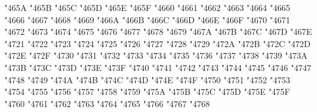 {\Uchar\jis"465A %
\Uchar\jis"465B %
\Uchar\jis"465C %
\Uchar\jis"465D %
\Uchar\jis"465E %
\Uchar\jis"465F %
\Uchar\jis"4660 %
\Uchar\jis"4661 %
\Uchar\jis"4662 %
\Uchar\jis"4663 %
\Uchar\jis"4664 %
\Uchar\jis"4665 %
\Uchar\jis"4666 %
\Uchar\jis"4667 %
\Uchar\jis"4668 %
\Uchar\jis"4669 %
\Uchar\jis"466A %
\Uchar\jis"466B %
\Uchar\jis"466C %
\Uchar\jis"466D %
\Uchar\jis"466E %
\Uchar\jis"466F %
\Uchar\jis"4670 %
\Uchar\jis"4671 %
\Uchar\jis"4672 %
\Uchar\jis"4673 %
\Uchar\jis"4674 %
\Uchar\jis"4675 %
\Uchar\jis"4676 %
\Uchar\jis"4677 %
\Uchar\jis"4678 %
\Uchar\jis"4679 %
\Uchar\jis"467A %
\Uchar\jis"467B %
\Uchar\jis"467C %
\Uchar\jis"467D %
\Uchar\jis"467E %
\Uchar\jis"4721 %
\Uchar\jis"4722 %
\Uchar\jis"4723 %
\Uchar\jis"4724 %
\Uchar\jis"4725 %
\Uchar\jis"4726 %
\Uchar\jis"4727 %
\Uchar\jis"4728 %
\Uchar\jis"4729 %
\Uchar\jis"472A %
\Uchar\jis"472B %
\Uchar\jis"472C %
\Uchar\jis"472D %
\Uchar\jis"472E %
\Uchar\jis"472F %
\Uchar\jis"4730 %
\Uchar\jis"4731 %
\Uchar\jis"4732 %
\Uchar\jis"4733 %
\Uchar\jis"4734 %
\Uchar\jis"4735 %
\Uchar\jis"4736 %
\Uchar\jis"4737 %
\Uchar\jis"4738 %
\Uchar\jis"4739 %
\Uchar\jis"473A %
\Uchar\jis"473B %
\Uchar\jis"473C %
\Uchar\jis"473D %
\Uchar\jis"473E %
\Uchar\jis"473F %
\Uchar\jis"4740 %
\Uchar\jis"4741 %
\Uchar\jis"4742 %
\Uchar\jis"4743 %
\Uchar\jis"4744 %
\Uchar\jis"4745 %
\Uchar\jis"4746 %
\Uchar\jis"4747 %
\Uchar\jis"4748 %
\Uchar\jis"4749 %
\Uchar\jis"474A %
\Uchar\jis"474B %
\Uchar\jis"474C %
\Uchar\jis"474D %
\Uchar\jis"474E %
\Uchar\jis"474F %
\Uchar\jis"4750 %
\Uchar\jis"4751 %
\Uchar\jis"4752 %
\Uchar\jis"4753 %
\Uchar\jis"4754 %
\Uchar\jis"4755 %
\Uchar\jis"4756 %
\Uchar\jis"4757 %
\Uchar\jis"4758 %
\Uchar\jis"4759 %
\Uchar\jis"475A %
\Uchar\jis"475B %
\Uchar\jis"475C %
\Uchar\jis"475D %
\Uchar\jis"475E %
\Uchar\jis"475F %
\Uchar\jis"4760 %
\Uchar\jis"4761 %
\Uchar\jis"4762 %
\Uchar\jis"4763 %
\Uchar\jis"4764 %
\Uchar\jis"4765 %
\Uchar\jis"4766 %
\Uchar\jis"4767 %
\Uchar\jis"4768 %
}
